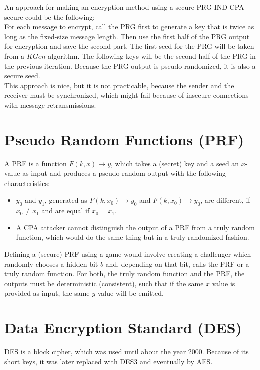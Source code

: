 An approach for making an encryption method using a secure PRG IND-CPA secure could be the following:\\
For each message to encrypt, call the PRG first to generate a key that is twice as long as the fixed-size message length. Then use the first half of the PRG output for encryption and save the second part. The first seed for the PRG will be taken from a $KGen$ algorithm. The following keys will be the second half of the PRG in the previous iteration. Because the PRG output is pseudo-randomized, it is also a secure seed.\\
This approach is nice, but it is not practicable, because the sender and the receiver must be synchronized, which might fail because of insecure connections with message retransmissions.

\section{Pseudo Random Functions (PRF)}

A PRF is a function $F(k,x) \rightarrow y$, which takes a (secret) key and a seed an $x$-value as input and produces a pseudo-random output with the following characteristics:


\begin{itemize}
    \item $y_0$ and $y_1$, generated as $F(k,x_0) \rightarrow y_0$ and $F(k,x_0) \rightarrow y_0$, are different, if $x_0 \neq x_1$ and are equal if $x_0 = x_1$.
    \item A CPA attacker cannot distinguish the output of a PRF from a truly random function, which would do the same thing but in a truly randomized fashion.
\end{itemize}

Defining a (secure) PRF using a game would involve creating a challenger which randomly chooses a hidden bit $b$ and, depending on that bit, calls the PRF or a truly random function. For both, the truly random function and the PRF, the outputs must be deterministic (consistent), such that if the same $x$ value is provided as input, the same $y$ value will be emitted.


\section{Data Encryption Standard (DES)}

DES is a block cipher, which was used until about the year 2000. Because of its short keys, it was later replaced with DES3 and eventually by AES.

